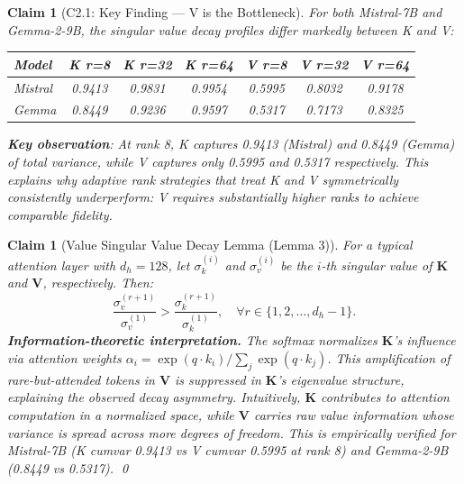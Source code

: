 \documentclass[11pt, a4paper, oneside]{article}
\newtheorem{claim}{Claim}
\theoremstyle{myplain}
\newtheorem*{claim*}{Claim}
\theoremstyle{mydefinition}
\theoremstyle{myremark}
\begin{document}
\begin{claim}[C2.1: Key Finding --- V is the Bottleneck]
    For both Mistral-7B and Gemma-2-9B, the singular value decay profiles differ markedly between K and V:
    
    \begin{center}
    \begin{tabular}{lcccccc}
    \toprule
    \textbf{Model} & \textbf{K r=8} & \textbf{K r=32} & \textbf{K r=64} & \textbf{V r=8} & \textbf{V r=32} & \textbf{V r=64} \\
    \midrule
    Mistral & 0.9413 & 0.9831 & 0.9954 & 0.5995 & 0.8032 & 0.9178 \\
    Gemma & 0.8449 & 0.9236 & 0.9597 & 0.5317 & 0.7173 & 0.8325 \\
    \bottomrule
    \end{tabular}
    \end{center}
    
    \textbf{Key observation}: At rank 8, K captures 0.9413 (Mistral) and 0.8449 (Gemma) of total variance, while V captures only 0.5995 and 0.5317 respectively. This explains why adaptive rank strategies that treat K and V symmetrically consistently underperform: V requires substantially higher ranks to achieve comparable fidelity.
    \label{claim:v_bottleneck}
\end{claim}

\begin{claim*}[Value Singular Value Decay Lemma (Lemma 3)]
For a typical attention layer with $d_h=128$, let $\sigma_k^{(i)}$ and $\sigma_v^{(i)}$ be the $i$-th singular value of $\mathbf{K}$ and $\mathbf{V}$, respectively. Then:
\begin{equation}
    \frac{\sigma_v^{(r+1)}}{\sigma_v^{(1)}} > \frac{\sigma_k^{(r+1)}}{\sigma_k^{(1)}}, \quad \forall r \in \{1, 2, \ldots, d_h-1\}.
    \tag{5}
\end{equation}
\textbf{Information-theoretic interpretation.} The softmax normalizes $\mathbf{K}$'s influence via attention weights $\alpha_i = \exp(q \cdot k_i)/\sum_j \exp(q \cdot k_j)$. This amplification of rare-but-attended tokens in $\mathbf{V}$ is suppressed in $\mathbf{K}$'s eigenvalue structure, explaining the observed decay asymmetry. Intuitively, $\mathbf{K}$ contributes to attention computation in a normalized space, while $\mathbf{V}$ carries raw value information whose variance is spread across more degrees of freedom. This is empirically verified for Mistral-7B (K cumvar 0.9413 vs V cumvar 0.5995 at rank 8) and Gemma-2-9B (0.8449 vs 0.5317). \qed
\end{claim*}
\end{document}
